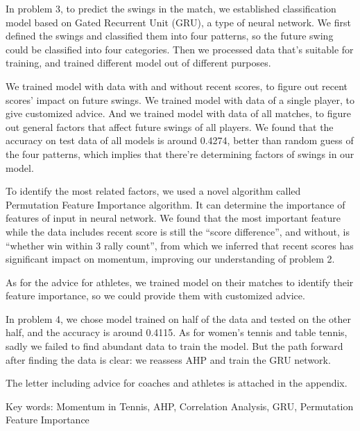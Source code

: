 In problem 3, to predict the swings in the match, we established classification model based on Gated Recurrent Unit (GRU),
a type of neural network.
We first defined the swings and classified them into four patterns, so the future swing could be classified into
four categories. Then we processed data that's suitable for training, and trained different model out of different purposes.

We trained model with data with and without recent scores, to figure out recent scores' impact on future swings.
We trained model with data of a single player, to give customized advice.
And we trained model with data of all matches, to figure out general factors that affect future swings of all players.
We found that the accuracy on test data of all models is around 0.4274, better than random guess of the four patterns,
which implies that there're determining factors of swings in our model.

To identify the most related factors, we used a novel algorithm called Permutation Feature Importance algorithm.
It can determine the importance of features of input in neural network. We found that the most important feature while
the data includes recent score is still the ``score difference'', and without, is ``whether win within 3 rally count'',
from which we inferred that recent scores has significant impact on momentum,
improving our understanding of problem 2.

As for the advice for athletes, we trained model on their matches to identify their feature importance,
so we could provide them with customized advice.

In problem 4, we chose model trained on half of the data and tested on the other half, and the accuracy is around 0.4115.
As for women's tennis and table tennis, sadly we failed to find abundant data to train the model.
But the path forward after finding the data is clear: we reassess AHP and train the GRU network.

The letter including advice for coaches and athletes is attached in the appendix.

Key words: Momentum in Tennis, AHP, Correlation Analysis, GRU, Permutation Feature Importance